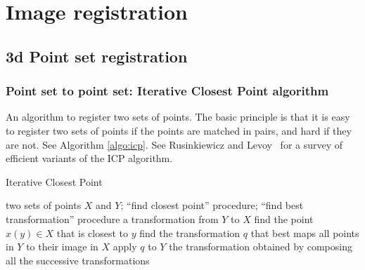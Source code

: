 \documentclass[11pt]{article} %
\begin{document}



\newpage

\section{Image registration}
  \subsection{ 3d Point set registration}
    \subsubsection{ Point set to point set: Iterative Closest Point algorithm \linebreak[4] \cite{besl:icp, chen:icp}}
An algorithm to register two sets of points. The basic principle is that it is easy to register two sets of points if the points are matched in pairs, and hard if they are not. See Algorithm \ref{algo:icp}. See Rusinkiewicz and Levoy~\cite{rusinkiewicz:icp} for a survey of efficient variants of the ICP algorithm.

\begin{algorithm}[h!]
\caption{Iterative Closest Point}
\label{algo:icp}
\begin{algorithmic}
  \REQUIRE two sets of points $X$ and $Y$; ``find closest point'' procedure; ``find best transformation'' procedure
  \ENSURE a transformation from $Y$ to $X$
  \REPEAT
      \STATE find the point $x(y) \in X$ that is closest to $y$
    \ENDFOR
    \STATE find the transformation $q$ that best maps all points in $Y$ to their image in $X$
    \STATE apply $q$ to $Y$
  \RETURN the transformation obtained by composing all the successive transformations
\end{algorithmic}
\end{algorithm}
\end{document}
